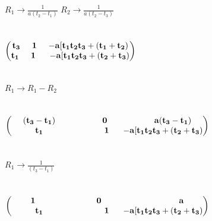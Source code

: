 \documentclass[journal,12pt,twocolumn]{IEEEtran}
\newcommand{\myvec}[1]{\ensuremath{\begin{pmatrix}#1\end{pmatrix}}}
\let\vec\mathbf
\begin{document}
\vspace{.5cm}

\hspace*{.5cm}$R_1 \rightarrow \frac{1}{a(t_2-t_1)}$ \hspace{.5cm} 
$R_2 \rightarrow \frac{1}{a(t_2-t_3)}$
\\
\\
\\
\myvec{\vec{{t_3 \hspace{.5cm}{1 \hspace{.5cm} {-a[t_1t_2t_3 + (t_1+t_2) }}}} \\ \vec{{t_1\hspace{.4cm}{\hspace{.1cm} 1 \hspace{.1cm} {\hspace{.5cm}-a[t_1t_2t_3 + (t_2+t_3) }}}}}
\\
\\
\\
\hspace*{.7cm} $R_1 \rightarrow {R_1-R_2}$
\\
\\
\\
\myvec{\vec{{(t_3-t_1) \hspace{2cm}{0 \hspace{2cm} {a(t_3-t_1) }}}} \\ \vec{{\hspace{1cm}t_1\hspace{2.5cm}{\hspace{.1cm} 1 \hspace{.1cm} {\hspace{.5cm}-a[t_1t_2t_3 + (t_2+t_3) }}}}}
\\
\\
\\
\hspace*{.8cm}$R_1 \rightarrow \frac{1}{(t_3-t_1)}$ 
\\
\\
\\
\myvec{\vec{{1 \hspace{2.6cm}{0 \hspace{3.3cm} {a }}}} \\ \vec{{\hspace{1cm}t_1\hspace{2.5cm}{\hspace{.1cm} 1 \hspace{.1cm} {\hspace{.5cm}-a[t_1t_2t_3 + (t_2+t_3) }}}}}
\\
\\
\end{document}
